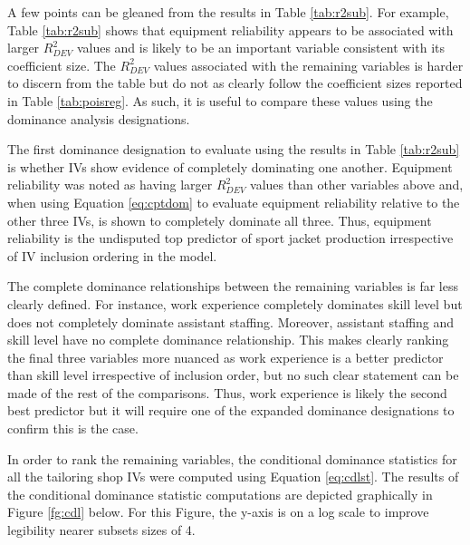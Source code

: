 \documentclass[man]{apa7}
\begin{document}
	A few points can be gleaned from the results in Table \ref{tab:r2sub}. 
	For example, Table \ref{tab:r2sub} shows that equipment reliability appears to be associated with larger $R^2_{DEV}$ values and is likely to be an important variable consistent with its coefficient size. 
	The $R^2_{DEV}$ values associated with the remaining variables is harder to discern from the table but do not as clearly follow the coefficient sizes reported in Table \ref{tab:poisreg}.
	As such, it is useful to compare these values using the dominance analysis designations.
	
	The first dominance designation to evaluate using the results in Table \ref{tab:r2sub} is whether IVs show evidence of completely dominating one another.
	Equipment reliability was noted as having larger $R^2_{DEV}$ values than other variables above and, when using Equation \ref{eq:cptdom} to evaluate equipment reliability relative to the other three IVs, is shown to completely dominate all three.
	Thus, equipment reliability is the undisputed top predictor of sport jacket production irrespective of IV inclusion ordering in the model.	
	
	The complete dominance relationships between the remaining variables is far less clearly defined. 
	For instance, work experience completely dominates skill level but does not completely dominate assistant staffing.
	Moreover, assistant staffing and skill level have no complete dominance relationship.
	This makes clearly ranking the final three variables more nuanced as work experience is a better predictor than skill level irrespective of inclusion order, but no such clear statement can be made of the rest of the comparisons.
	Thus, work experience is likely the second best predictor but it will require one of the expanded dominance designations to confirm this is the case.
	
	In order to rank the remaining variables, the conditional dominance statistics for all the tailoring shop IVs were computed using Equation \ref{eq:cdlst}.
	The results of the conditional dominance statistic computations are depicted graphically in Figure \ref{fg:cdl} below.
	For this Figure, the y-axis is on a log scale to improve legibility nearer subsets sizes of 4.
	
\end{document}
